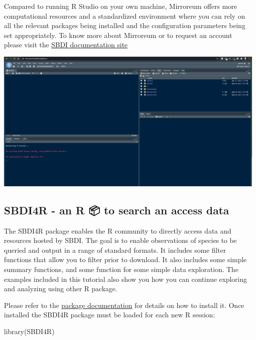 \documentclass[
  10pt,
]{article}
\newenvironment{Shaded}{\begin{snugshade}}{\end{snugshade}}
\newcommand{\FunctionTok}[1]{\textcolor[rgb]{0.00,0.00,0.00}{#1}}
\newcommand{\NormalTok}[1]{#1}
\begin{document}
Compared to running R Studio on your own machine, Mirroreum offers more computational resources and a standardized environment where you can rely on all the relevant packages being installed and the configuration parameters being set appropriately. To know more about Mirroreum or to request an account please visit the \href{https://docs.biodiversitydata.se/analyse-data/mirroreum/}{SBDI documentation site}

\href{https://mirroreum.biodiversitydata.se/auth-sign-in}{\includegraphics{images/Mirroreum.png}}

\hypertarget{sbdi4r---an-r-to-search-an-access-data}{%
\subsection*{SBDI4R - an R 📦 to search an access data}\label{sbdi4r---an-r-to-search-an-access-data}}

The SBDI4R package enables the R community to directly access data and resources hosted by SBDI. The goal is to enable observations of species to be queried and output in a range of standard formats. It includes some filter functions that allow you to filter prior to download. It also includes some simple summary functions, and some function for some simple data exploration. The examples included in this tutorial also show you how you can continue exploring and analyzing using other R package.

Please refer to the \href{https://biodiversitydata-se.github.io/SBDI4R}{package documentation} for details on how to install it. Once installed the SBDI4R package must be loaded for each new R session:

\begin{Shaded}
\begin{Highlighting}[]
\FunctionTok{library}\NormalTok{(SBDI4R)}
\end{Highlighting}
\end{Shaded}
\end{document}
